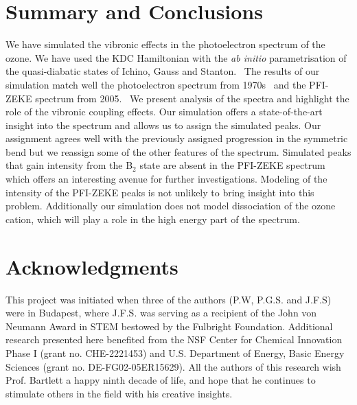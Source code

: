 \documentclass[12pt,pra,aps,superscriptaddress]{revtex4-2}
\begin{document}
\section{Summary and Conclusions} 

We have simulated the vibronic effects in the photoelectron spectrum of the
ozone.  We have used the KDC Hamiltonian\cite{Cederbaum:LVC:84, KDC:81,
Koppel:CIbookCh7:04} with the \emph{ab initio} parametrisation of the
quasi-diabatic states of Ichino, Gauss and Stanton.~\cite{Stanton:EOMIPdeg:09}
The results of our simulation match well the photoelectron spectrum from
1970s~\cite{dyke:O3:74} and the PFI-ZEKE spectrum from
2005.~\cite{Willitsch:O3ZEKE:2005} We present analysis of the spectra and
highlight the role of the vibronic coupling effects. Our simulation offers a
state-of-the-art insight into the spectrum and allows us to assign the
simulated peaks. Our assignment agrees well with the previously assigned
progression in the symmetric bend but we reassign some of the other features
of the spectrum. Simulated peaks that gain intensity from the B$_2$ state are
absent in the PFI-ZEKE spectrum which offers an interesting avenue for further
investigations. Modeling of the intensity of the PFI-ZEKE peaks is not
unlikely to bring insight into this problem.  Additionally our simulation does
not model dissociation of the ozone cation, which will play a role in the high
energy part of the spectrum.

\section{Acknowledgments} 

This project was initiated when three of the authors (P.W, P.G.S. and J.F.S)
were in Budapest, where J.F.S. was serving as a recipient of the John von
Neumann Award in STEM bestowed by the Fulbright Foundation. Additional
research presented here benefited from the NSF Center for Chemical Innovation
Phase I (grant no. CHE-2221453) and U.S. Department of Energy, Basic Energy
Sciences (grant no. DE-FG02-05ER15629).  All the authors of this research wish
Prof. Bartlett a happy ninth decade of life, and hope that he continues to
stimulate others in the field with his creative insights.

\clearpage



\end{document}
